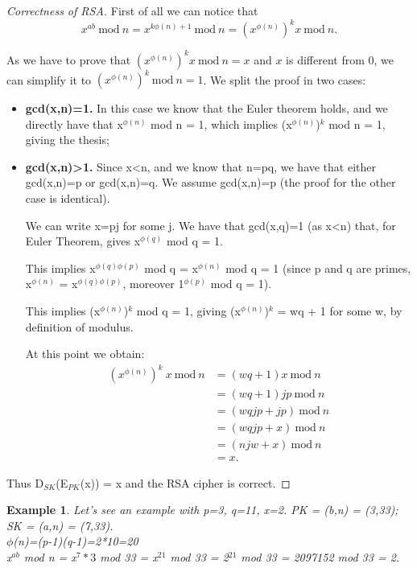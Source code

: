 \documentclass[a4paper, 12pt]{report}
\newtheorem{example}{\textbf{Example}}
\begin{document}
\begin{proof}[Correctness of RSA]
	First of all we can notice that 
	\[x^{ab} \ \text{mod} \ n = x^{k\phi(n)+1} \ \text{mod} \ n = (x^{\phi(n)})^kx \ \text{mod} \ n.\]
	
	As we have to prove that $(x^{\phi(n)})^kx \ \text{mod} \ n = x$ and $x$ is different from 0, we can simplify it to $(x^{\phi(n)})^k \ \text{mod} \ n = 1$.
	We split the proof in two cases:
	\begin{itemize}
		\item \textbf{gcd(x,n)=1.} In this case we know that the Euler theorem holds, and we directly have that x$^{\phi(n)}$ mod n = 1, which implies (x$^{\phi(n)}$)$^k$ mod n = 1, giving the thesis;
		\item \textbf{gcd(x,n)>1.} Since x<n, and we know that n=pq, we have that either gcd(x,n)=p or gcd(x,n)=q. We assume gcd(x,n)=p (the proof for the other case is identical).
		
		We can write x=pj for some j. We have that gcd(x,q)=1 (as x<n) that, for Euler Theorem, gives x$^{\phi(q)}$ mod q = 1. 
		
		This implies x$^{\phi(q)\phi(p)}$ mod q = x$^{\phi(n)}$ mod q = 1 (since p and q are primes, x$^{\phi(n)}$ = x$^{\phi(q)\phi(p)}$, moreover 1$^{\phi(p)}$ mod q = 1).
		
		This implies (x$^{\phi(n)}$)$^k$ mod q = 1, giving (x$^{\phi(n)}$)$^k$ = wq + 1 for some w, by definition of modulus.
		
		At this point we obtain:
		\begin{align*}
		(x^{\phi(n)})^k \ x \ \text{mod} \ n &= (wq + 1)x \ \text{mod} \ n\\
		&= (wq + 1)jp \ \text{mod} \ n\\
		&= (wqjp +jp) \ \text{mod} \ n\\
		&= (wqjp + x) \ \text{mod} \ n\\
		&= (njw + x) \ \text{mod} \ n\\
		&= x. 
		\end{align*}
	\end{itemize}
	
	Thus D$_{SK}$(E$_{PK}$(x)) = x and the RSA cipher is correct.
\end{proof}

\begin{example}
	Let's see an example with p=3, q=11, x=2. PK = (b,n) = (3,33); SK = (a,n) = (7,33).\\
	$\phi$(n)=(p-1)(q-1)=2*10=20\\
	x$^{ab}$ mod n = x$^7*3$ mod 33 = x$^{21}$ mod 33 = 2$^{21}$ mod 33 = 2097152 mod 33 = 2.
\end{example}
\end{document}
